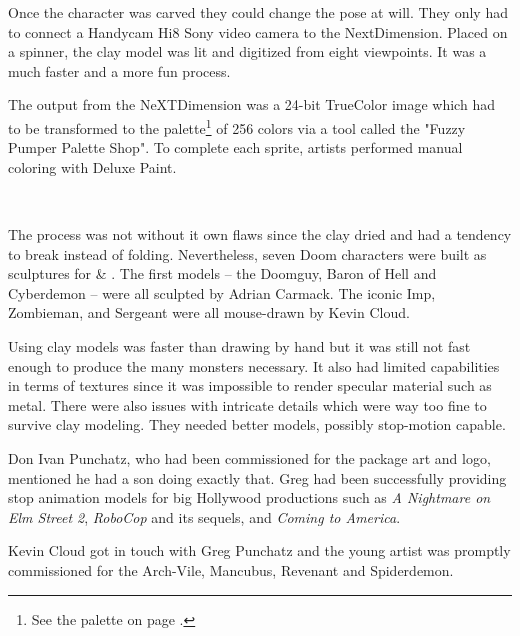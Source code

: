 \vspace{-4mm}
Once the character was carved they could change the pose at will. They only had to connect a Handycam Hi8 Sony video camera to the NextDimension. Placed on a spinner, the clay model was lit and digitized from eight viewpoints. It was a much faster and a more fun process.\\
\par
The output from the NeXTDimension was a 24-bit TrueColor image which had to be transformed to the \doom{} palette\footnote{See the \doom{} palette on page \pageref{doom_palette}.} of 256 colors via a tool called the "Fuzzy Pumper Palette Shop". To complete each sprite, artists performed manual coloring with Deluxe Paint.\\
\par
{}\\
\par
The process was not without it own flaws since the clay dried and had a tendency to break instead of folding. Nevertheless, seven Doom characters were built as sculptures for \doom{} \& \doomii{}. The first models -- the Doomguy, Baron of Hell and Cyberdemon -- were all sculpted by Adrian Carmack. The iconic Imp, Zombieman, and Sergeant were all mouse-drawn by Kevin Cloud.\\
\par
{}

\par





\vspace{-4mm}
Using clay models was faster than drawing by hand but it was still not fast enough to produce the many monsters necessary. It also had limited capabilities in terms of textures since it was impossible to render specular material such as metal. There were also issues with intricate details which were way too fine to survive clay modeling. They needed better models, possibly stop-motion capable.\\
\par
Don Ivan Punchatz, who had been commissioned for the \doom{} package art and logo, mentioned he had a son doing exactly that. Greg had been successfully providing stop animation models for big Hollywood productions such as \textit{A Nightmare on Elm Street 2}, \textit{RoboCop} and its sequels, and \textit{Coming to America}. \\
\par
Kevin Cloud got in touch with Greg Punchatz and the young artist was promptly commissioned for the Arch-Vile, Mancubus, Revenant and Spiderdemon.\\
\par

